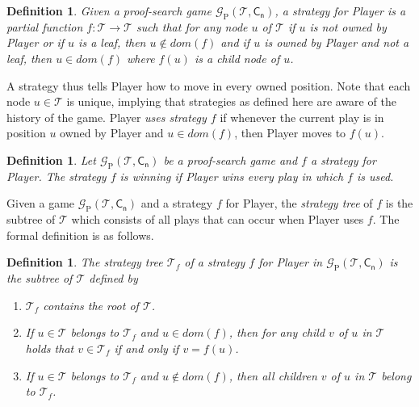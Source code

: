 \documentclass{myifcolog}
\newcommand{\hickp}{\mathrm{P}}
\newtheorem{definition}[theorem]{Definition}
\numberwithin{theorem}{section}
\begin{document}
\begin{definition}\label{d: strategy}
    Given a proof-search game $\mathcal{G}_\hickp(\mathcal{T}, \mathsf{C_n})$, a \emph{strategy} for Player is a partial function $f : \mathcal{T} \longrightarrow \mathcal{T}$ such that for any node $u$ of $\mathcal{T}$ if $u$ is not owned by Player or if $u$ is a leaf, then  $u \not \in dom(f)$ and if $u$ is owned by Player and not a leaf, then $u \in dom(f)$ where $f(u)$ is a child node of $u$.
\end{definition}

A strategy thus tells Player how to move in every owned position. Note that each node $u \in \mathcal{T}$ is unique, implying that strategies as defined here are aware of the history of the game. Player \emph{uses strategy $f$} if whenever the current play is in position $u$ owned by Player and $u \in dom(f)$, then Player moves to $f(u)$.

\begin{definition}\label{d: winning strategy}
    Let $\mathcal{G}_\hickp(\mathcal{T}, \mathsf{C_n})$ be a proof-search game and $f$ a strategy for Player. The strategy $f$ is \emph{winning} if Player wins every play in which $f$ is used.
\end{definition}

Given a game $\mathcal{G}_\hickp(\mathcal{T}, \mathsf{C_n})$ and a strategy $f$ for Player, the \emph{strategy tree} of $f$ is the subtree of $\mathcal{T}$ which consists of all plays that can occur when Player uses $f$. The formal definition is as follows.

\begin{definition}\label{d: strategy tree}
    The \emph{strategy tree} $\mathcal{T}_f$ of a strategy $f$ for Player in $\mathcal{G}_\hickp(\mathcal{T}, \mathsf{C_n})$ is the subtree of $\mathcal{T}$ defined by
    \begin{enumerate}
        \item $\mathcal{T}_f$ contains the root of $\mathcal{T}$.
        \item If $u \in \mathcal{T}$ belongs to $\mathcal{T}_f$ and $u \in dom(f)$, then for any child $v$ of $u$ in $\mathcal{T}$ holds that $v \in \mathcal{T}_f$ if and only if $v=f(u)$.
        \item If $u \in \mathcal{T}$ belongs to $\mathcal{T}_f$ and $u \not \in dom(f)$, then all children $v$ of $u$ in $\mathcal{T}$ belong to $\mathcal{T}_f$.
    \end{enumerate}
\end{definition}
\end{document}
